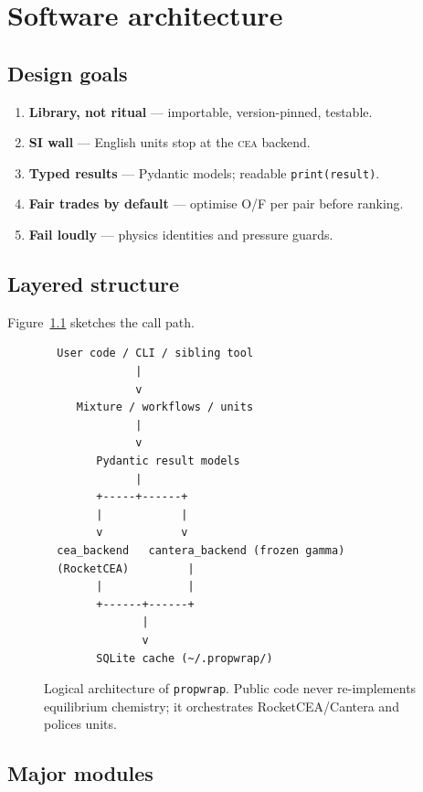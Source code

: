 \documentclass[11pt,a4paper]{report}
\newcommand{\pw}{\texttt{propwrap}}
\newcommand{\cea}{\textsc{cea}}
\begin{document}
\chapter{Software architecture}
\label{ch:arch}

\section{Design goals}

\begin{enumerate}[leftmargin=*]
  \item \textbf{Library, not ritual} --- importable, version-pinned, testable.
  \item \textbf{SI wall} --- English units stop at the \cea{} backend.
  \item \textbf{Typed results} --- Pydantic models; readable \texttt{print(result)}.
  \item \textbf{Fair trades by default} --- optimise O/F per pair before ranking.
  \item \textbf{Fail loudly} --- physics identities and pressure guards.
\end{enumerate}

\section{Layered structure}

Figure~\ref{fig:arch} sketches the call path.

\begin{figure}[H]
\centering
\begin{verbatim}
  User code / CLI / sibling tool
              |
              v
     Mixture / workflows / units
              |
              v
        Pydantic result models
              |
        +-----+------+
        |            |
        v            v
  cea_backend   cantera_backend (frozen gamma)
  (RocketCEA)         |
        |             |
        +------+------+
               |
               v
        SQLite cache (~/.propwrap/)
\end{verbatim}
\caption{Logical architecture of \pw{}. Public code never re-implements
equilibrium chemistry; it orchestrates RocketCEA/Cantera and polices units.}
\label{fig:arch}
\end{figure}

\section{Major modules}
\end{document}
